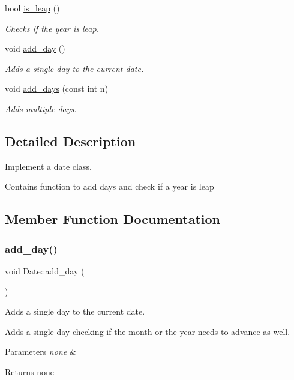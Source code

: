\begin{DoxyCompactItemize}
bool \hyperlink{class_date_af12996155259f3fb64206bf250d50e10}{is\+\_\+leap} ()
\begin{DoxyCompactList}\small\item\em Checks if the year is leap. \end{DoxyCompactList}\item 
void \hyperlink{class_date_a1060f2334b942a33f16e76471225d0db}{add\+\_\+day} ()
\begin{DoxyCompactList}\small\item\em Adds a single day to the current date. \end{DoxyCompactList}\item 
void \hyperlink{class_date_a6bd05d49058041113ee34870a1268f2c}{add\+\_\+days} (const int n)
\begin{DoxyCompactList}\small\item\em Adds multiple days. \end{DoxyCompactList}\end{DoxyCompactItemize}


\subsection{Detailed Description}
Implement a date class. 

Contains function to add days and check if a year is leap 

\subsection{Member Function Documentation}
\mbox{\label{class_date_a1060f2334b942a33f16e76471225d0db}} 
\subsubsection{\texorpdfstring{add\+\_\+day()}{add\_day()}}
{\footnotesize\ttfamily void Date\+::add\+\_\+day (\begin{DoxyParamCaption}{ }\end{DoxyParamCaption})}



Adds a single day to the current date. 

Adds a single day checking if the month or the year needs to advance as well. 
\begin{DoxyParams}{Parameters}
{\em none} & \\
\hline
\end{DoxyParams}
\begin{DoxyReturn}{Returns}
none 
\end{DoxyReturn}
\mbox{\label{class_date_a6bd05d49058041113ee34870a1268f2c}} 
